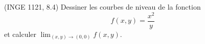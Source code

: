 

\begin{exercice}\label{exoFoncDeuxVar0013}

	(INGE 1121, 8.4) Dessiner les courbes de niveau de la fonction
	\begin{equation}
		f(x,y)=\frac{ x^2 }{ y }
	\end{equation}
	et calculer $\lim_{(x,y)\to(0,0)}f(x,y)$.

\end{exercice}
